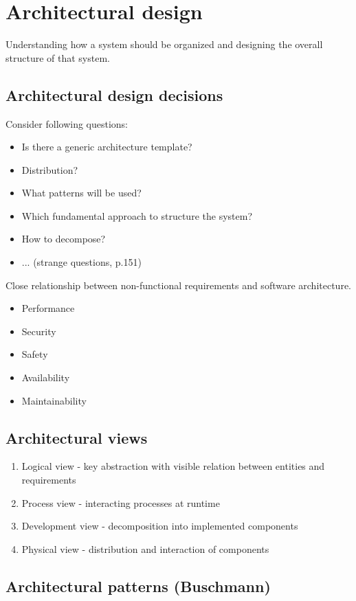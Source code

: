 \documentclass[a4paper,11pt,twocolumn]{report}
\begin{document}
    \chapter{Architectural design}
    Understanding how a system should be organized and designing the overall
    structure of that system.
    \section{Architectural design decisions}
    Consider following questions:
    \begin{itemize}
        \item Is there a generic architecture template?
        \item Distribution?
        \item What patterns will be used?
        \item Which fundamental approach  to structure the system?
        \item How to decompose?
        \item ... (strange questions, p.151)
    \end{itemize}
    Close relationship between non-functional requirements and software
    architecture.
    \begin{itemize}
        \item Performance
        \item Security
        \item Safety
        \item Availability
        \item Maintainability
    \end{itemize}
    \section{Architectural views}
    \begin{enumerate}
        \item Logical view - key abstraction with visible relation between 
            entities and requirements
        \item Process view - interacting processes at runtime
        \item Development view - decomposition into implemented components
        \item Physical view - distribution and interaction of components
    \end{enumerate}
    \section{Architectural patterns (Buschmann)}
\end{document}
